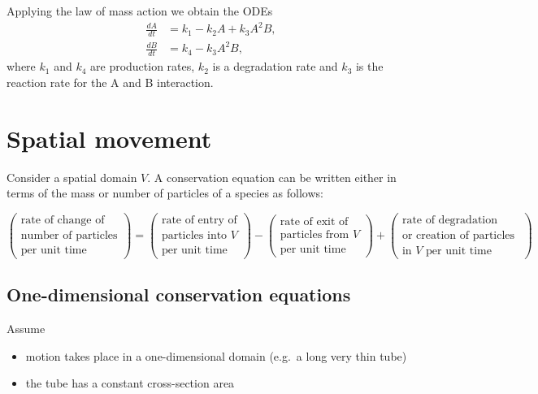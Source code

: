 \documentclass[
  letterpaper,
  DIV=11,
  numbers=noendperiod]{scrreprt}
\providecommand{\tightlist}{%
  \setlength{\itemsep}{0pt}\setlength{\parskip}{0pt}}\usepackage{longtable,booktabs,array}
\theoremstyle{definition}
\theoremstyle{plain}
\theoremstyle{plain}
\theoremstyle{remark}
\begin{document}
Applying the law of mass action we obtain the ODEs \[
\begin{aligned}
\frac{d A}{ dt} &= k_1 - k_2 A + k_3 A^2 B,  \\
\frac{d B}{ dt} &= k_4 - k_3 A^2 B,
\end{aligned}
\] where \(k_1\) and \(k_4\) are production rates, \(k_2\) is a
degradation rate and \(k_3\) is the reaction rate for the A and B
interaction.

\hypertarget{spatial-movement}{%
\section{Spatial movement}\label{spatial-movement}}

Consider a spatial domain \(V\). A conservation equation can be written
either in terms of the mass or number of particles of a species as
follows:

\[
\begin{pmatrix}
\text{rate of change of}\\
\text{number of particles} \\
\text{per unit time } 
\end{pmatrix}
= \begin{pmatrix}
\text{rate of entry of}\\
\text{particles into $V$}\\
\text{per unit time}
\end{pmatrix}
- \begin{pmatrix}
\text{rate of exit of }\\
\text{particles from $V$}\\
\text{per unit time}
\end{pmatrix}
+ 
 \begin{pmatrix}
 \text{rate of degradation}\\
 \text{or creation of particles }\\
  \text{in $V$ per unit time} 
\end{pmatrix}
\]

\hypertarget{one-dimensional-conservation-equations}{%
\subsection{One-dimensional conservation
equations}\label{one-dimensional-conservation-equations}}

Assume

\begin{itemize}
\tightlist
\item
  motion takes place in a one-dimensional domain (e.g.~a long very thin
  tube)
\item
  the tube has a constant cross-section area
\end{itemize}
\end{document}
